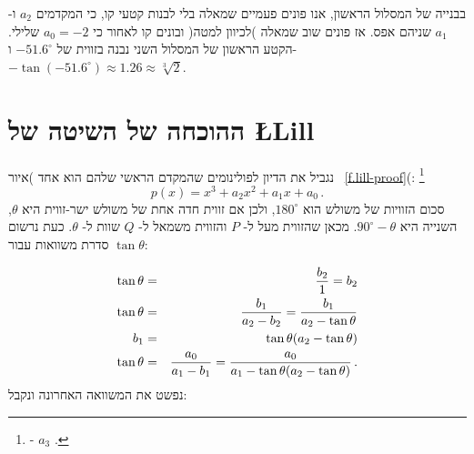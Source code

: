 בבנייה של המסלול הראשון, אנו פונים פעמיים שמאלה בלי לבנות קטעי קו, כי המקדמים
$a_2$
ו-%
$a_1$
שניהם אפס. אז פונים שוב שמאלה )לכיוון למטה( ובונים קו לאחור כי 
$a_0=-2$
שלילי. הקטע הראשון של המסלול השני נבנה בזווית של
$-51.6^\circ$
ו-%
$-\tan (-51.6^\circ)\approx 1.26\approx \sqrt[3]{2}$.




\section{ההוכחה של השיטה של
\L{Lill}}\label{s.proof}

נגביל את הדיון לפולינומים שהמקדם הראשי שלהם הוא אחד )איור~%
\ref{f.lill-proof}(:%
\footnote{%
-%
$a_3$
.}
\[
p(x)=x^3+a_2x^2+a_1x+a_0\,.
\]
סכום הזוויות של משולש הוא 
$180^\circ$,
ולכן אם זווית חדה אחת של משולש ישר-זווית היא
$\theta$, 
השנייה היא
$90^\circ-\theta$.
מכאן שהזווית מעל ל-%
$P$
והזווית משמאל ל-%
$Q$
שוות ל-%
$\theta$.
כעת נרשום סדרת משוואות עבור
$\tan \theta$:

\begin{eqnarray*}
\tan \theta &=& \displaystyle\frac{b_2}{1}=b_2\\
\tan \theta &=& \displaystyle\frac{b_1}{a_2-b_2}=\displaystyle\frac{b_1}{a_2-\tan\theta}\\
b_1&=&\tan\theta (a_2-\tan\theta)\\
\tan \theta &=& \displaystyle\frac{a_0}{a_1-b_1}=\displaystyle\frac{a_0}{a_1-\tan\theta(a_2-\tan\theta)}\,.
\end{eqnarray*}
נפשט את המשוואה האחרונה ונקבל:

